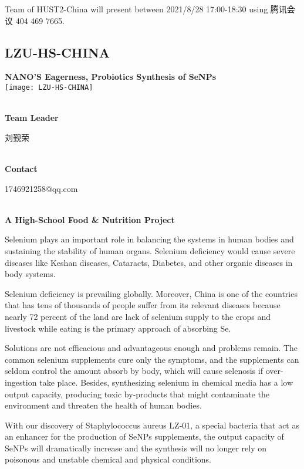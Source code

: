 Team of HUST2-China will present between        2021/8/28 17:00-18:30 using 腾讯会议 404 469 7665.
\newpage


\subsection{\textcolor{Blu}{ LZU-HS-CHINA } }
\vspace{5mm}
\begin{center}
\large{
  \textbf{ NANO'S Eagerness, Probiotics Synthesis of SeNPs }\\

  \texttt{[image: LZU-HS-CHINA]}
}
\end{center}
\textbf{\\Team Leader}

  刘觐荣


\textbf{\\Contact}

  1746921258@qq.com


\textbf{\\A High-School Food & Nutrition Project\\}\begin{spacing}{1.5}

Selenium plays an important role in balancing the systems in human bodies and sustaining the stability of human organs. Selenium deficiency would cause severe diseases like Keshan diseases, Cataracts, Diabetes, and other organic diseases in body systems.

Selenium deficiency is prevailing globally. Moreover, China is one of the countries that has tens of thousands of people suffer from its relevant diseases because nearly 72 percent of the land are lack of selenium supply to the crops and livestock while eating is the primary approach of absorbing Se.

Solutions are not efficacious and advantageous enough and problems remain. The common selenium supplements cure only the symptoms, and the supplements can seldom control the amount absorb by body, which will cause selenosis if over-ingestion take place. Besides, synthesizing selenium in chemical media has a low output capacity, producing toxic by-products that might contaminate the environment and threaten the health of human bodies.

With our discovery of Staphylococcus aureus LZ-01, a special bacteria that act as an enhancer for the production of SeNPs supplements, the output capacity of SeNPs will dramatically increase and the synthesis will no longer rely on poisonous and unstable chemical and physical conditions.\end{spacing}
\\

